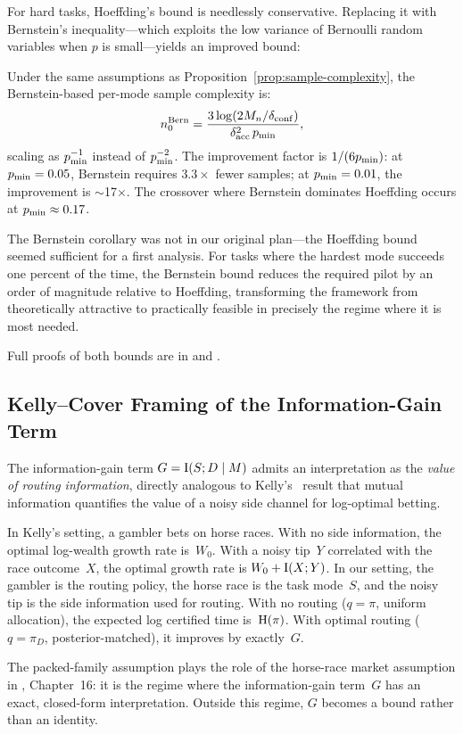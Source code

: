 For hard tasks, Hoeffding's bound is needlessly conservative.
Replacing it with Bernstein's inequality---which exploits the low variance of Bernoulli random variables when $p$ is small---yields an improved bound:

\begin{corollary}
\label{cor:bernstein}
Under the same assumptions as Proposition~\ref{prop:sample-complexity}, the Bernstein-based per-mode sample complexity is:
\begin{equation}
\label{eq:bernstein-sample}
  n_0^{\mathrm{Bern}} = \frac{3\log(2M_n/\delta_{\mathrm{conf}})}{\delta_{\mathrm{acc}}^2\,p_{\min}},
\end{equation}
scaling as $p_{\min}^{-1}$ instead of $p_{\min}^{-2}$.
The improvement factor is $1/(6p_{\min})$: at $p_{\min} = 0.05$, Bernstein requires $3.3\times$ fewer samples; at $p_{\min} = 0.01$, the improvement is $\sim$17$\times$.
The crossover where Bernstein dominates Hoeffding occurs at $p_{\min} \approx 0.17$.
\end{corollary}

The Bernstein corollary was not in our original plan---the Hoeffding bound seemed sufficient for a first analysis.
For tasks where the hardest mode succeeds one percent of the time, the Bernstein bound reduces the required pilot by an order of magnitude relative to Hoeffding, transforming the framework from theoretically attractive to practically feasible in precisely the regime where it is most needed.

Full proofs of both bounds are in  and .

\subsection{Kelly--Cover Framing of the Information-Gain Term}
\label{sec:kelly-cover}

The information-gain term $G = \mathrm{I}(S; D \mid M)$ admits an interpretation as the \emph{value of routing information}, directly analogous to Kelly's~\citeyearpar{kelly1956new} result that mutual information quantifies the value of a noisy side channel for log-optimal betting.

In Kelly's setting, a gambler bets on horse races.
With no side information, the optimal log-wealth growth rate is~$W_0$.
With a noisy tip~$Y$ correlated with the race outcome~$X$, the optimal growth rate is $W_0 + \mathrm{I}(X; Y)$.
In our setting, the gambler is the routing policy, the horse race is the task mode~$S$, and the noisy tip is the side information used for routing.
With no routing ($q = \pi$, uniform allocation), the expected log certified time is~$\mathrm{H}(\pi)$.
With optimal routing ($q = \pi_D$, posterior-matched), it improves by exactly~$G$.

The packed-family assumption plays the role of the horse-race market assumption in \citet{cover2006elements}, Chapter~16: it is the regime where the information-gain term~$G$ has an exact, closed-form interpretation.
Outside this regime, $G$ becomes a bound rather than an identity.
